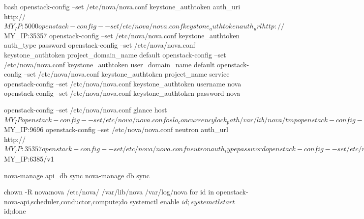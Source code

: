\begin{code-block}{bash}
openstack-config --set /etc/nova/nova.conf keystone_authtoken auth_uri http://$MY_IP:5000
openstack-config --set /etc/nova/nova.conf keystone_authtoken auth_url http://$MY_IP:35357
openstack-config --set /etc/nova/nova.conf keystone_authtoken auth_type password
openstack-config --set /etc/nova/nova.conf keystone_authtoken project_domain_name default
openstack-config --set /etc/nova/nova.conf keystone_authtoken user_domain_name default
openstack-config --set /etc/nova/nova.conf keystone_authtoken project_name service
openstack-config --set /etc/nova/nova.conf keystone_authtoken username nova
openstack-config --set /etc/nova/nova.conf keystone_authtoken password nova

openstack-config --set /etc/nova/nova.conf glance host $MY_IP

openstack-config --set /etc/nova/nova.conf oslo_concurrency lock_path /var/lib/nova/tmp

openstack-config --set /etc/nova/nova.conf neutron url http://$MY_IP:9696
openstack-config --set /etc/nova/nova.conf neutron auth_url http://$MY_IP:35357
openstack-config --set /etc/nova/nova.conf neutron auth_type password
openstack-config --set /etc/nova/nova.conf neutron project_domain_name default
openstack-config --set /etc/nova/nova.conf neutron user_domain_name default
openstack-config --set /etc/nova/nova.conf neutron region_name wuhan
openstack-config --set /etc/nova/nova.conf neutron project_name service
openstack-config --set /etc/nova/nova.conf neutron username neutron
openstack-config --set /etc/nova/nova.conf neutron password neutron
openstack-config --set /etc/nova/nova.conf neutron service_metadata_proxy True
openstack-config --set /etc/nova/nova.conf neutron metadata_proxy_shared_secret awcloud

openstack-config --set /etc/nova/nova.conf conductor workers 4

openstack-config --set /etc/nova/nova.conf ironic admin_username ironic
openstack-config --set /etc/nova/nova.conf ironic admin_password ironic
openstack-config --set /etc/nova/nova.conf ironic admin_tenant_name service
openstack-config --set /etc/nova/nova.conf ironic api_endpoint http://$MY_IP:6385/v1

nova-manage api_db sync
nova-manage db sync

chown -R nova:nova /etc/nova/ /var/lib/nova /var/log/nova
for id in openstack-nova-{api,scheduler,conductor,compute};do systemctl enable $id;systemctl start $id;done
\end{code-block}


